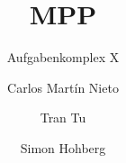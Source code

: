 \documentclass[a4paper,ngerman]{scrartcl}
\begin{document}
\title{MPP}
\subtitle{Aufgabenkomplex X}
\author{Carlos Martín Nieto \and Tran Tu \and Simon Hohberg}
\maketitle
\end{document}
